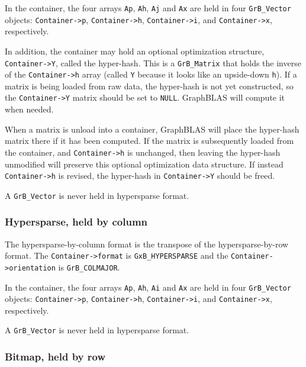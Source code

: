 In the container, the four arrays \verb'Ap', \verb'Ah', \verb'Aj' and \verb'Ax'
are held in four \verb'GrB_Vector' objects:
\verb'Container->p',
\verb'Container->h',
\verb'Container->i', and
\verb'Container->x', respectively.

In addition, the container may hold an optional optimization structure,
\verb'Container->Y', called the hyper-hash.  This is a \verb'GrB_Matrix' that
holds the inverse of the \verb'Container->h' array (called \verb'Y' because it
looks like an upside-down \verb'h').  If a matrix is being loaded from raw
data, the hyper-hash is not yet constructed, so the \verb'Container->Y' matrix
should be set to \verb'NULL'.  GraphBLAS will compute it when needed.

When a matrix is unload into a container, GraphBLAS will place the hyper-hash
matrix there if it has been computed.  If the matrix is subsequently loaded
from the container, and \verb'Container->h' is unchanged, then leaving the
hyper-hash unmodified will preserve this optional optimization data structure.
If instead \verb'Container->h' is revised, the hyper-hash in
\verb'Container->Y' should be freed.

A \verb'GrB_Vector' is never held in hypersparse format.

\subsubsection{Hypersparse, held by column}
\label{format_hypersparse_by_col}

The hypersparse-by-column format is the transpose of the hypersparse-by-row format.
The \verb'Container->format' is \verb'GxB_HYPERSPARSE' and the
\verb'Container->orientation' is \verb'GrB_COLMAJOR'.

In the container, the four arrays \verb'Ap', \verb'Ah', \verb'Ai' and \verb'Ax'
are held in four \verb'GrB_Vector' objects:
\verb'Container->p',
\verb'Container->h',
\verb'Container->i', and
\verb'Container->x', respectively.

A \verb'GrB_Vector' is never held in hypersparse format.

\subsubsection{Bitmap, held by row}
\label{format_bitmap_by_row}

